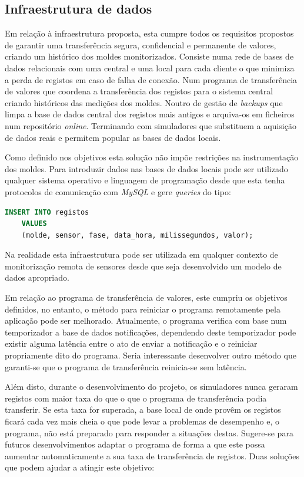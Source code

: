 \documentclass[11pt,twoside,a4paper]{report}
\begin{document}
\subsection{Infraestrutura de dados}
Em relação à infraestrutura proposta, esta cumpre todos os requisitos propostos de garantir uma transferência segura, confidencial e permanente de valores, criando um histórico dos moldes monitorizados. Consiste numa rede de bases de dados relacionais com uma central e uma local para cada cliente o que minimiza a perda de registos em caso de falha de conexão. Num programa de transferência de valores que coordena a transferência dos registos para o sistema central criando históricos das medições dos moldes. Noutro de gestão de \textit{backups} que limpa a base de dados central dos registos mais antigos e arquiva-os em ficheiros num repositório \textit{online}. Terminando com simuladores que substituem a aquisição de dados reais e permitem popular as bases de dados locais.\par 
Como definido nos objetivos esta solução não impõe restrições na instrumentação dos moldes. Para introduzir dados nas bases de dados locais pode ser utilizado qualquer sistema operativo e linguagem de programação desde que esta tenha protocolos de comunicação com \textit{MySQL} e gere \textit{queries} do tipo:
\begin{lstlisting}[language = SQL]
	INSERT INTO registos
	VALUES
	(molde, sensor, fase, data_hora, milissegundos, valor);
\end{lstlisting}
Na realidade esta infraestrutura pode ser utilizada em qualquer contexto de monitorização remota de sensores desde que seja desenvolvido um modelo de dados apropriado.\par 
Em relação ao programa de transferência de valores, este cumpriu os objetivos definidos, no entanto, o método para reiniciar o programa remotamente pela aplicação pode ser melhorado. Atualmente, o programa verifica com base num temporizador a base de dados notificações, dependendo deste temporizador pode existir alguma latência entre o ato de enviar a notificação e o reiniciar propriamente dito do programa. Seria interessante desenvolver outro método que garanti-se que o programa de transferência reinicia-se sem latência.\par 
Além disto, durante o desenvolvimento do projeto, os simuladores nunca geraram registos com maior taxa do que o que o programa de transferência podia transferir. Se esta taxa for superada, a base local de onde provêm os registos ficará cada vez mais cheia o que pode levar a problemas de desempenho e, o programa, não está preparado para responder a situações destas. Sugere-se para futuros desenvolvimentos adaptar o programa de forma a que este possa aumentar automaticamente a sua taxa de transferência de registos. Duas soluções que podem ajudar a atingir este objetivo:
\end{document}
